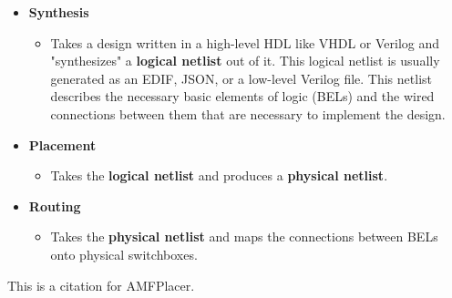 \documentclass{article}
\begin{document}
\begin{itemize}[label={\textbullet}, left=0.25cm]
    \item \textbf{Synthesis}
    \begin{itemize}[label={--}, left=0.25cm]
        \item Takes a design written in a high-level HDL like VHDL or Verilog and "synthesizes" a \textbf{logical netlist} out of it. This logical netlist is usually generated as an EDIF, JSON, or a low-level Verilog file. This netlist describes the necessary basic elements of logic (BELs) and the wired connections between them that are necessary to implement the design.
    \end{itemize}

    \item \textbf{Placement}
    \begin{itemize}[label={--}, left=0.25cm]
        \item Takes the \textbf{logical netlist} and produces a \textbf{physical netlist}.
    \end{itemize}

    \item \textbf{Routing}
    \begin{itemize}[label={--}, left=0.25cm]
        \item Takes the \textbf{physical netlist} and maps the connections between BELs onto physical switchboxes.
    \end{itemize}

\end{itemize}

This is a citation for AMFPlacer. \cite{AMFPlacer}



\end{document}
